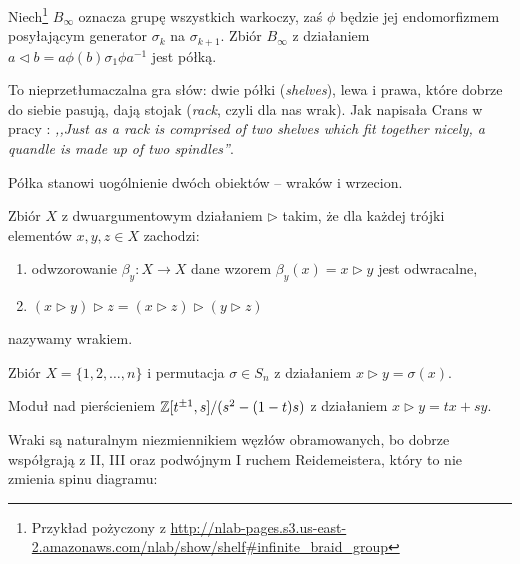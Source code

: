 \begin{example}
%
    Niech\footnote{Przykład pożyczony z \url{http://nlab-pages.s3.us-east-2.amazonaws.com/nlab/show/shelf\#infinite_braid_group}} $B_\infty$ oznacza grupę wszystkich warkoczy, zaś $\phi$ będzie jej endomorfizmem posyłającym generator $\sigma_k$ na $\sigma_{k+1}$.
    Zbiór $B_\infty$ z działaniem $a \triangleleft b = a\phi(b)\sigma_1 \phi{a} ^{-1}$ jest półką.
\end{example}

To nieprzetłumaczalna gra słów: dwie półki (\emph{shelves}), lewa i prawa, które dobrze do siebie pasują, dają stojak (\emph{rack}, czyli dla nas wrak).
Jak napisała Crans w pracy \cite[s. 86]{crans04}: \emph{,,Just as a rack is comprised of two shelves which fit together nicely, a quandle is made up of two spindles''}.

Półka stanowi uogólnienie dwóch obiektów -- wraków i wrzecion.

\begin{definition}[wrak]
%
    Zbiór $X$ z dwuargumentowym działaniem $\triangleright$ takim, że dla każdej trójki elementów $x, y, z \in X$ zachodzi:
    \begin{enumerate}
        \item odwzorowanie $\beta_y \colon X \to X$ dane wzorem $\beta_y(x) = x \triangleright y$ jest odwracalne,
        \item $(x \triangleright y) \triangleright z = (x \triangleright z) \triangleright (y \triangleright z)$
    \end{enumerate}
    nazywamy wrakiem.
\end{definition}

\begin{example}
    Zbiór $X = \{1, 2, \ldots, n\}$ i permutacja $\sigma \in S_n$ z działaniem $x \triangleright y = \sigma(x)$.
\end{example}

\begin{example}
    Moduł nad pierścieniem $\mathbb Z[t^{\pm 1}, s]/(s^2 - (1-t)s)$ z działaniem $x \triangleright y = tx+sy$.
\end{example}

Wraki są naturalnym niezmiennikiem węzłów obramowanych, bo dobrze współgrają z II, III oraz podwójnym I ruchem Reidemeistera, który to nie zmienia spinu diagramu:
\begin{comment}
\[
    \LargeReidemeisterOneLeftRightQuandleProof
    \cong
    \LargeReidemeisterOneStraightQuandleProofRotated
\]
\end{comment}

